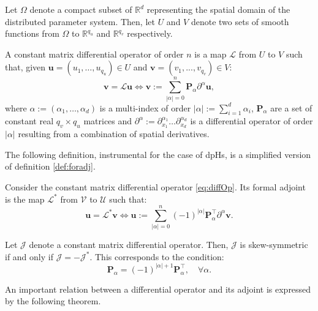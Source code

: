 Let $\Omega$ denote a compact subset of $\mathbb{R}^d$ representing the spatial domain of the distributed parameter system. Then, let ${U}$ and ${V}$ denote two sets of smooth functions from $\Omega$ to $\mathbb{R}^{q_u}$ and $\mathbb{R}^{q_v}$ respectively.
\begin{definition}
	A constant matrix differential operator of order $n$ is a map $\mathcal{L}$ from ${U}$ to ${V}$ such that, given $\bm{u} = (u_1 , \dots , u_{q_u}) \in {U}$ and $\bm{v} = (v_1 , . . . , v_{q_v}) \in {V}$:
	\begin{equation}
	\label{eq:diffOp}
	\bm{v} = \mathcal{L} \bm{u} \iff \bm{v} := \sum_{|\alpha|=0}^n  \bm{P}_{\alpha} \partial^{\alpha} \bm{u},
	\end{equation}
	where $\alpha := (\alpha_1, \dots , \alpha_d)$ is a multi-index of order $|\alpha| := \sum_{i=1}^d \alpha_i$, $\bm{P}_\alpha$ are a set of constant real $q_v \times q_u$ matrices and $\partial^{\alpha} := \partial_{x_1}^{\alpha_1} \dots \partial_{x_d}^{\alpha_d}$ is a differential operator of order $|\alpha|$ resulting from a combination of spatial derivatives. 
\end{definition}
The following definition, instrumental for the case of dpHs, is a simplified version of definition \eqref{def:foradj}.
\begin{definition}
	Consider the constant matrix differential operator \eqref{eq:diffOp}. Its formal adjoint is the map $\mathcal{L}^*$ from $\mathcal{V}$ to $\mathcal{U}$ such that:
	\begin{equation}
	\bm{u} = \mathcal{L}^* \bm{v} \iff \bm{u} := \sum_{|\alpha|=0}^n  (-1)^{|\alpha|} \bm{P}_{\alpha}^\top \partial^{\alpha} \bm{v}.
	\end{equation}
\end{definition}
\begin{definition}
	\label{def:skewOp}
	Let $\mathcal{J}$ denote a constant matrix differential operator. Then, $\mathcal{J}$ is skew-symmetric if and only if $\mathcal{J} = -\mathcal{J}^*$. This corresponds to the condition:
	\begin{equation}
	\bm{P}_{\alpha} = (-1)^{|\alpha| + 1} \bm{P}_{\alpha}^\top, \quad \forall \alpha.
	\end{equation}
\end{definition}
An important relation between a differential operator and
its adjoint is expressed by the following theorem.

